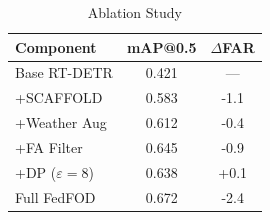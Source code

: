 \begin{table}[t]
\centering
\caption{Ablation Study}
\label{tab:ablation}
\begin{tabular}{lcc}
\toprule
Component & mAP@0.5 & $\Delta$FAR \\
\midrule
Base RT-DETR & 0.421 & — \\
+SCAFFOLD & 0.583 & -1.1 \\
+Weather Aug & 0.612 & -0.4 \\
+FA Filter & 0.645 & -0.9 \\
+DP ($\varepsilon\!=\!8$) & 0.638 & +0.1 \\
Full FedFOD & 0.672 & -2.4 \\
\bottomrule
\end{tabular}
\end{table}